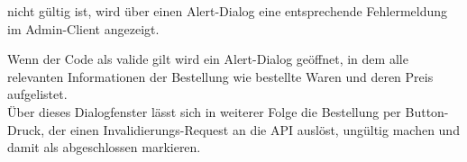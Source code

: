 nicht gültig ist, wird über einen Alert-Dialog eine entsprechende Fehlermeldung im Admin-Client
angezeigt.

Wenn der Code als valide gilt wird ein Alert-Dialog geöffnet, in dem alle relevanten Informationen
der Bestellung wie bestellte Waren und deren Preis aufgelistet.\\
Über dieses Dialogfenster lässt sich in weiterer Folge die Bestellung per Button-Druck, der einen
Invalidierungs-Request an die API auslöst, ungültig machen und damit als abgeschlossen markieren.